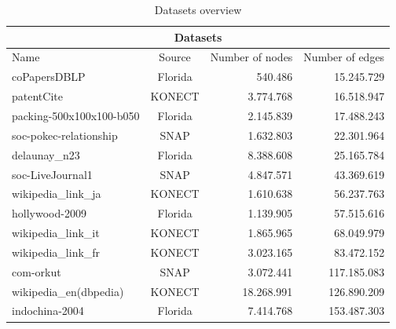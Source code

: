 \begin{table}
	\centering
	\begin{tabular}{ |l||c||r|r|}
		\hline
		\multicolumn{4}{|c|}{Datasets} \\
		\hline
		Name& Source &  Number of nodes  & Number of edges\\
		\hline
		coPapersDBLP & Florida  & 540.486    & 15.245.729\\
		patentCite & KONECT &3.774.768 & 16.518.947 \\
		packing-500x100x100-b050 & Florida & 2.145.839 & 17.488.243 \\
		soc-pokec-relationship & SNAP &1.632.803 & 22.301.964 \\ 
		delaunay\_n23 & Florida &8.388.608 & 25.165.784\\
		soc-LiveJournal1 & SNAP & 4.847.571 & 43.369.619 \\
		wikipedia\_link\_ja & KONECT & 1.610.638 & 56.237.763\\
		hollywood-2009 & Florida &1.139.905 & 57.515.616 \\
		wikipedia\_link\_it & KONECT & 1.865.965 & 68.049.979\\
		wikipedia\_link\_fr & KONECT & 3.023.165 & 83.472.152\\
		com-orkut & SNAP &3.072.441 &117.185.083\\
		wikipedia\_en(dbpedia) & KONECT & 18.268.991 & 126.890.209 \\
		indochina-2004 & Florida & 7.414.768 & 153.487.303 \\
		\hline
	\end{tabular}
	\caption{\label{tab:dataset}Datasets overview}
\end{table} 
